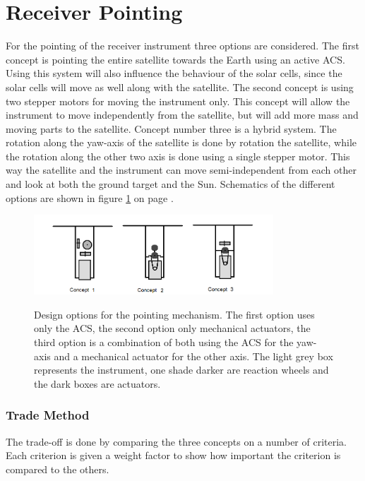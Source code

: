 \section{Receiver Pointing}
For the pointing of the receiver instrument three options are considered. The first concept is pointing the entire satellite towards the Earth using an active \ac{ACS}. Using this system will also influence the behaviour of the solar cells, since the solar cells will move as well along with the satellite. The second concept is using two stepper motors for moving the instrument only. This concept will allow the instrument to move independently from the satellite, but will add more mass and moving parts to the satellite. Concept number three is a hybrid system. The rotation along the yaw-axis of the satellite is done by rotation the satellite, while the rotation along the other two axis is done using a single stepper motor. This way the satellite and the instrument can move semi-independent from each other and look at both the ground target and the Sun. Schematics of the different options are shown in figure \ref{fig:pointeroptions} on page \pageref{fig:pointeroptions}.

\begin{figure}[h]
\centering
\includegraphics[width=0.8\textwidth, bb=0 0 895px 298px]{img/pointingsystemoptions.png} 
\label{fig:pointeroptions}
\caption[Design options for the pointing mechanism]{Design options for the pointing mechanism. The first option uses only the \ac{ACS}, the second option only mechanical actuators, the third option is a combination of both using the \ac{ACS} for the yaw-axis and a mechanical actuator for the other axis. The light grey box represents the instrument, one shade darker are reaction wheels and the dark boxes are actuators.}
\end{figure}

\subsubsection{Trade Method}
The trade-off is done by comparing the three concepts on a number of criteria. Each criterion is given a weight factor to show how important the criterion is compared to the others.

